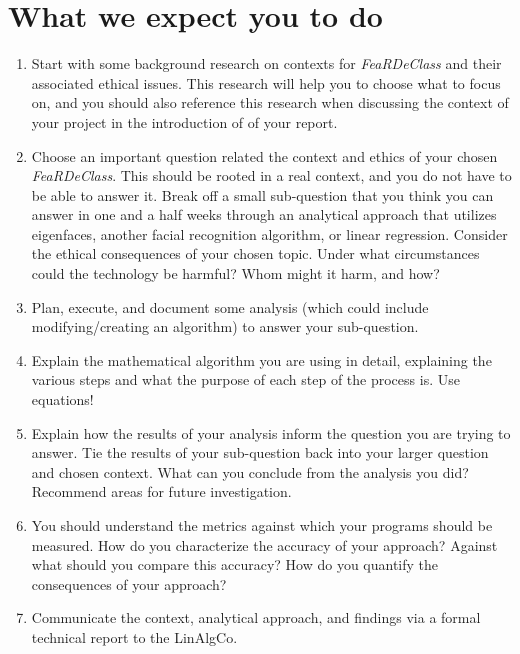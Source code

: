 \section{What we expect you to do}

\begin{enumerate}
\item Start with some background research on contexts for \textit{FeaRDeClass} and their associated ethical issues.  This research will help you to choose what to focus on, and you should also reference this research when discussing the context of your project in the introduction of of your report.

\item Choose an important question related the context and ethics of your chosen \textit{FeaRDeClass}. This should be rooted in a real context, and you do not have to be able to answer it. Break off a small sub-question that you think you can answer in one and a half weeks through an analytical approach that utilizes eigenfaces, another facial recognition algorithm, or linear regression. Consider the ethical consequences of your chosen topic. Under what circumstances could the technology be harmful? Whom might it harm, and how?

\item Plan, execute, and document some analysis (which could include modifying/creating an algorithm) to answer your sub-question.

\item Explain the mathematical algorithm you are using in detail, explaining the various steps and what the purpose of each step of the process is. Use equations!

\item Explain how the results of your analysis inform the question you are trying to answer. Tie the results of your sub-question back into your larger question and chosen context. What can you conclude from the analysis you did? Recommend areas for future investigation.

\item You should understand the metrics against which your programs should be measured.  How do you characterize the accuracy of your approach?  Against what should you compare this accuracy? How do you quantify the consequences of your approach?

\item Communicate the context, analytical approach, and findings via a formal technical report to the LinAlgCo.
\end{enumerate}

